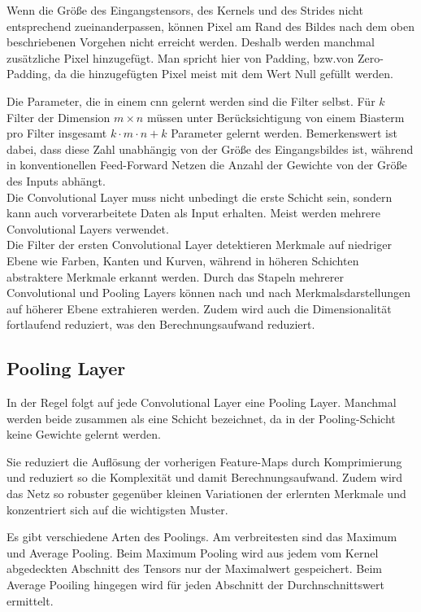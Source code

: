Wenn die Größe des Eingangstensors, des Kernels und des Strides nicht entsprechend zueinanderpassen, können Pixel 
am Rand des Bildes nach dem oben beschriebenen Vorgehen nicht erreicht werden. Deshalb werden manchmal zusätzliche 
Pixel hinzugefügt. Man spricht hier von Padding, bzw.von Zero-Padding, da die hinzugefügten Pixel meist mit dem Wert Null 
gefüllt werden. \cite{Michelucci:2019}

Die Parameter, die in einem \ac{cnn} gelernt werden sind die Filter selbst. Für $k$ Filter der Dimension $m \times n$ 
müssen unter Berücksichtigung von einem Biasterm pro Filter insgesamt $k \cdot m \cdot n + k$ Parameter gelernt werden. 
Bemerkenswert ist dabei, dass diese Zahl unabhängig von der Größe des Eingangsbildes ist, während in konventionellen 
Feed-Forward Netzen die Anzahl der Gewichte von der Größe des Inputs abhängt.\cite{Michelucci:2019}\\

Die Convolutional Layer muss nicht unbedingt die erste Schicht sein, sondern kann auch vorverarbeitete Daten 
als Input erhalten. Meist werden mehrere Convolutional Layers verwendet.\cite{Michelucci:2019}\\
Die Filter der ersten Convolutional Layer detektieren Merkmale auf niedriger Ebene wie Farben, Kanten und Kurven, 
während in höheren Schichten abstraktere Merkmale erkannt werden. Durch das Stapeln mehrerer Convolutional 
und Pooling Layers können nach und nach Merkmalsdarstellungen auf höherer Ebene extrahieren werden. 
Zudem wird auch die Dimensionalität fortlaufend reduziert, was den Berechnungsaufwand reduziert. 
\cite{Gu:2018} \cite{Saha:2018}

\subsection{Pooling Layer}%
In der Regel folgt auf jede Convolutional Layer eine Pooling Layer. Manchmal werden beide zusammen 
als eine Schicht bezeichnet, da in der Pooling-Schicht keine Gewichte gelernt werden. \cite{Michelucci:2019}

Sie reduziert die Auflösung der vorherigen Feature-Maps durch Komprimierung und reduziert so die 
Komplexität und damit Berechnungsaufwand. Zudem wird das Netz so robuster gegenüber kleinen 
Variationen der erlernten Merkmale und konzentriert sich auf die wichtigsten Muster. \cite{Namatevs.2017}

Es gibt verschiedene Arten des Poolings. Am verbreitesten sind das Maximum und Average Pooling. 
Beim Maximum Pooling wird aus jedem vom Kernel abgedeckten Abschnitt des Tensors nur der Maximalwert gespeichert. 
Beim Average Pooiling hingegen wird für jeden Abschnitt der Durchnschnittswert ermittelt. \cite{Saha:2018}

